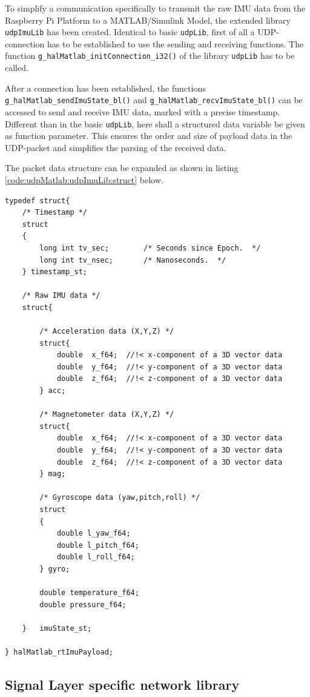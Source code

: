 To simplify a communication specifically to transmit the raw IMU data from the Raspberry Pi Platform to a MATLAB/Simulink Model, the extended library \texttt{udpImuLib} has been created. Identical to basic \texttt{udpLib}, first of all a UDP-connection has to be established to use the sending and receiving functions. The function \texttt{g\_halMatlab\_initConnection\_i32()} of the library \texttt{udpLib} has to be called.

After a connection has been established, the functions \texttt{g\_halMatlab\_sendImuState\_bl()} and \texttt{g\_halMatlab\_recvImuState\_bl()} can be accessed to send and receive IMU data, marked with a precise timestamp. Different than in the basic \texttt{udpLib}, here shall a structured data variable be given as function parameter. This ensures the order and size of payload data in the UDP-packet and simplifies the parsing of the received data.

The packet data structure can be expanded as shown in listing \ref{code:udpMatlab:udpImuLib:struct} below.

\begin{lstlisting}[caption=C-Code snippet of the expanded IMU data packet structure,label=code:udpMatlab:udpImuLib:struct]
typedef struct{
	/* Timestamp */
	struct
	{
		long int tv_sec;		/* Seconds since Epoch.  */
		long int tv_nsec;		/* Nanoseconds.  */
	} timestamp_st;
	
	/* Raw IMU data */
	struct{
	
		/* Acceleration data (X,Y,Z) */
		struct{
			double	x_f64;	//!< x-component of a 3D vector data
			double	y_f64;	//!< y-component of a 3D vector data
			double	z_f64;	//!< z-component of a 3D vector data
		} acc;
		
		/* Magnetometer data (X,Y,Z) */
		struct{
			double	x_f64;	//!< x-component of a 3D vector data
			double	y_f64;	//!< y-component of a 3D vector data
			double	z_f64;	//!< z-component of a 3D vector data
		} mag;
		
		/* Gyroscope data (yaw,pitch,roll) */
		struct
		{
			double l_yaw_f64;
			double l_pitch_f64;
			double l_roll_f64;
		} gyro;
		
		double temperature_f64;
		double pressure_f64;
		
	}	imuState_st;
	
} halMatlab_rtImuPayload;
\end{lstlisting}

\subsection{Signal Layer specific network library}
\label{sec:udpMatlab:udpLib:udpSigLib}

